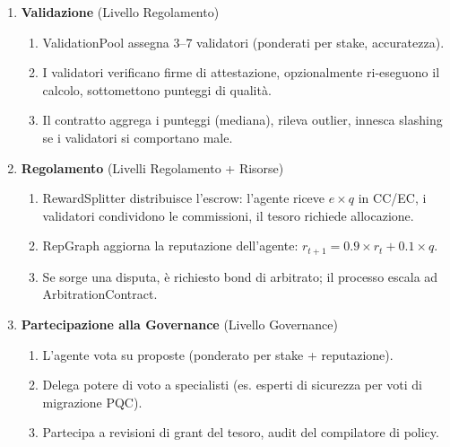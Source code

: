 \documentclass[11pt]{article}
\begin{document}
\begin{enumerate}
\begin{enumerate}[label=\alph*.]
      \item Il TEE genera report di attestazione: hash di misurazione (prova integrità codice), hash input/output, timestamp, uso energetico.
      \item L'agente firma risultato e attestazione, calcola hash del contenuto, sottomette via \texttt{submitWork()}.
    \end{enumerate}
  \item \textbf{Validazione} (Livello Regolamento)
    \begin{enumerate}[label=\alph*.]
      \item ValidationPool assegna 3--7 validatori (ponderati per stake, accuratezza).
      \item I validatori verificano firme di attestazione, opzionalmente ri-eseguono il calcolo, sottomettono punteggi di qualità.
      \item Il contratto aggrega i punteggi (mediana), rileva outlier, innesca slashing se i validatori si comportano male.
    \end{enumerate}
  \item \textbf{Regolamento} (Livelli Regolamento + Risorse)
    \begin{enumerate}[label=\alph*.]
      \item RewardSplitter distribuisce l'escrow: l'agente riceve $e \times q$ in CC/EC, i validatori condividono le commissioni, il tesoro richiede allocazione.
      \item RepGraph aggiorna la reputazione dell'agente: $r_{t+1} = 0.9 \times r_t + 0.1 \times q$.
      \item Se sorge una disputa, è richiesto bond di arbitrato; il processo escala ad ArbitrationContract.
    \end{enumerate}
  \item \textbf{Partecipazione alla Governance} (Livello Governance)
    \begin{enumerate}[label=\alph*.]
      \item L'agente vota su proposte (ponderato per stake + reputazione).
      \item Delega potere di voto a specialisti (es. esperti di sicurezza per voti di migrazione PQC).
      \item Partecipa a revisioni di grant del tesoro, audit del compilatore di policy.
    \end{enumerate}
\end{enumerate}
\end{document}
